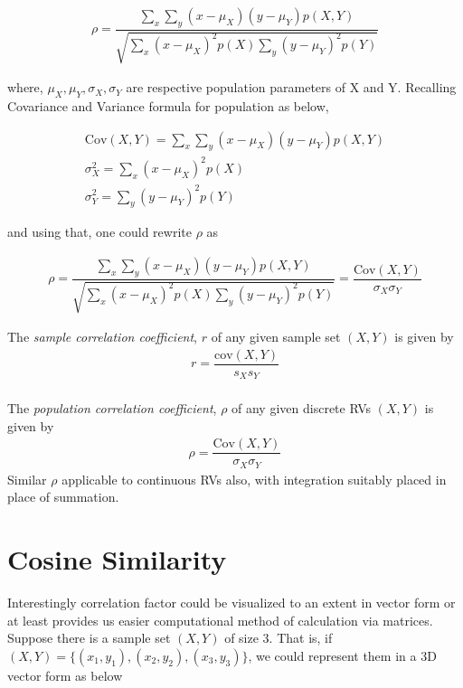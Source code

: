 \documentclass[tikz = true, float=false, crop=false, 11pt]{standalone}
\begin{document}
	\begin{align}
	\rho = \dfrac{\sum_x \sum_y (x - \mu_X)(y - \mu_Y)p(X,Y)}{\sqrt{\sum_x (x - \mu_X)^2p(X) \sum_y (y - \mu_Y)^2p(Y)} }
	\end{align}

	where, $\mu_X, \mu_Y, \sigma_X, \sigma_Y$ are respective population parameters of X and Y. Recalling Covariance and Variance formula for population as below, 
	
	$$\begin{aligned}
	\mathrm{Cov}(X,Y) = \sum_x \sum_y (x - \mu_X)(y - \mu_Y)p(X,Y) \\
	\sigma_X^2 = \sum_x (x - \mu_X)^2p(X)  \\
	\sigma_Y^2 = \sum_y (y - \mu_Y)^2p(Y) 
	\end{aligned}$$
	
	and using that, one could rewrite $\rho$ as
	
	\begin{align}
		\rho = \dfrac{\sum_x \sum_y (x - \mu_X)(y - \mu_Y)p(X,Y)}{\sqrt{\sum_x (x - \mu_X)^2p(X) \sum_y (y - \mu_Y)^2p(Y)} } = \dfrac{\mathrm{Cov}(X,Y)}{\sigma_X\sigma_Y} 
	\end{align}

	\begin{tcolorbox}[colback=green!5,colframe=green!40!black,title=Sample and Population Correlation]
	The \textit{sample correlation coefficient}, $r$ of any given sample set $(X,Y)$ is given by 
	\begin{align}
		r = \dfrac{\mathrm{cov}(X,Y)}{s_X s_Y} \label{eq:C6_001}
	\end{align} \\
	The \textit{population correlation coefficient}, $\rho$ of any given discrete RVs $(X,Y)$ is given by 
	\begin{align}
		\rho = \dfrac{\mathrm{Cov}(X,Y)}{\sigma_X\sigma_Y} \label{eq:C6_002}
	\end{align}
	Similar $\rho$ applicable to continuous RVs also, with integration suitably placed in place of summation. 
	\end{tcolorbox}		

	\section{Cosine Similarity}
	
	Interestingly correlation factor could be visualized to an extent in vector form or at least provides us easier computational method of calculation via matrices. Suppose there is a sample set $(X,Y)$ of size 3. That is, if $(X,Y) = \{ (x_1,y_1), (x_2,y_2), (x_3,y_3) \}$, 
	we could represent them in a 3D vector form as below
	
\end{document}
